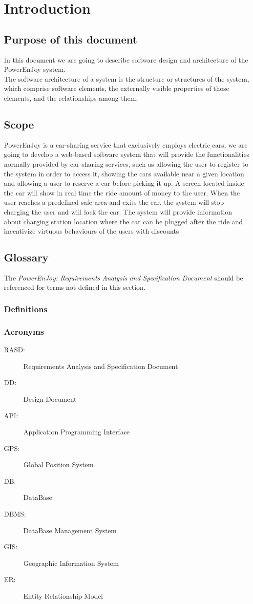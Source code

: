 \section{Introduction}
\subsection{Purpose of this document}
In this document we are going to describe software design and architecture of the PowerEnJoy system.\\
The software architecture of a system is the structure or structures of the system, which comprise software elements, the externally visible properties of those elements, and the relationships among them.\cite{SoftwareArch}

\subsection{Scope}
PowerEnJoy is a car-sharing service that exclusively employs electric cars; we are going to develop a web-based software system that will provide the functionalities normally provided by car-sharing services, such as allowing the user to register to the system in order to access it, showing the cars available near a given location and allowing a user to reserve a car before picking it up.
A screen located inside the car will show in real time the ride amount of money to the user. When the user reaches a predefined safe area and exits the car, the system will stop charging the user and will lock the car. The system will provide information about charging station location where the car can be plugged after the ride and incentivize virtuous behaviours of the users with discounts\cite{RASD}
\subsection{Glossary}
The \emph{PowerEnJoy: Requirements Analysis and Specification Document}\cite{RASD} should be referenced for terms not defined in this section.
\subsubsection{Definitions}

\subsubsection{Acronyms}
	\begin{description}
		\item [RASD:] Requirements Analysis and Specification Document
		\item [DD:] Design Document
		\item [API:] Application Programming Interface
		\item [GPS:] Global Position System
		\item [DB:] DataBase
		\item [DBMS:] DataBase Management System
		\item [GIS:] Geographic Information System
		\item [ER:] Entity Relationship Model
	\end{description}
